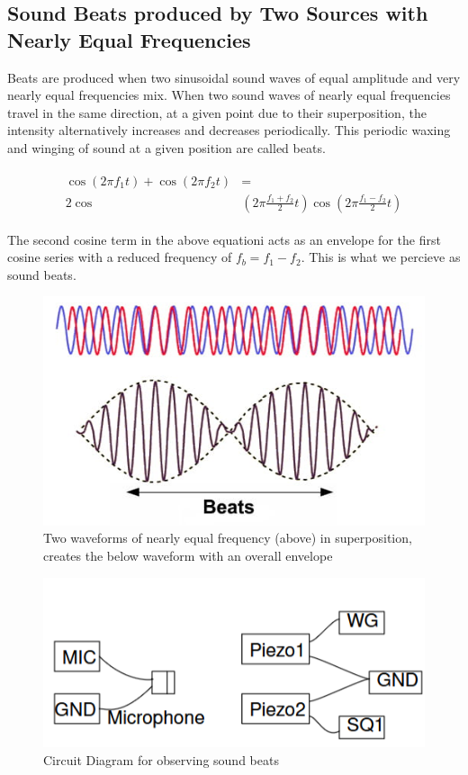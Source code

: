 \subsection{Sound Beats produced by Two Sources with Nearly Equal Frequencies}
Beats are produced when two sinusoidal sound waves of equal amplitude and very nearly equal frequencies mix. When two sound waves of nearly equal frequencies travel in the same direction, at a given point due to their superposition, the intensity alternatively increases and decreases periodically. This periodic waxing and winging of sound at a given position are called beats. 

\begin{align*}
    \begin{split}
        \cos(2\pi f_1t) + \cos(2\pi f_2t) &=\\ 2 \cos& \left(2\pi\frac{f_1+f_2}{2}t\right) \cos \left(2\pi\frac{f_1-f_2}{2}t\right)
    \end{split}
\end{align*}

The second cosine term in the above equationi acts as an envelope for the first cosine series with a reduced frequency of $f_b = f_1-f_2$. This is what we percieve as sound beats.

\begin{figure}[h]
    \centering
    \includegraphics[width=1\columnwidth]{images/Beats.jpg}
    \caption{Two waveforms of nearly equal frequency (above) in superposition, creates the below waveform with an overall envelope}
    \label{th:8}
\end{figure}
\begin{figure}[h]
    \centering
    \includegraphics[width=1\columnwidth]{images/beats2.png}
    \caption{Circuit Diagram for observing sound beats}
    \label{th:9}
\end{figure}
